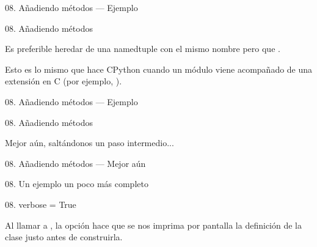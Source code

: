 \begin{frame}{08. Añadiendo métodos — Ejemplo}
  \scriptsize
\end{frame}

\begin{frame}{08. Añadiendo métodos}
  \begin{block}{}
    \centering
    Es preferible heredar de una namedtuple con el mismo nombre pero
    que .
  \end{block}

  \begin{center}
    \small
    Esto es lo mismo que hace CPython cuando un módulo viene
    acompañado de una extensión en C (por ejemplo,
    ).
  \end{center}
\end{frame}

\begin{frame}{08. Añadiendo métodos — Ejemplo}
  \scriptsize
\end{frame}

\begin{frame}{08. Añadiendo métodos}
  \begin{block}{}
   \large
   \centering
   Mejor aún, saltándonos un paso intermedio...
  \end{block}
\end{frame}

\begin{frame}{08. Añadiendo métodos — Mejor aún}
  \footnotesize
\end{frame}

\begin{frame}{08. Un ejemplo un poco más completo}
  \scriptsize
\end{frame}

\begin{frame}{08. verbose = True}
  \begin{block}{}
    \centering
    Al llamar a , la opción
     hace que se nos imprima por pantalla la
    definición de la clase justo antes de construirla.
  \end{block}
\end{frame}

